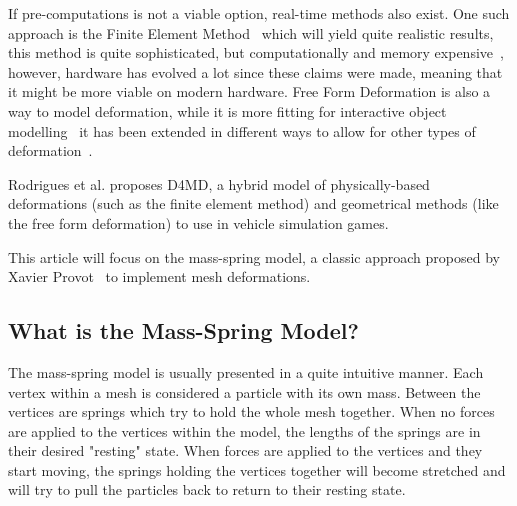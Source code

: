 If pre-computations is not a viable option, real-time methods also exist.
One such approach is the Finite Element Method~\cite{muller_fem} which will yield quite realistic results, this method is quite sophisticated, but computationally and memory expensive~\cite{rodrigues2005d4md}, however, hardware has evolved a lot since these claims were made, meaning that it might be more viable on modern hardware.
Free Form Deformation is also a way to model deformation, while it is more fitting for interactive object modelling~\cite{rodrigues2005d4md} it has been extended in different ways to allow for other types of deformation~\cite{coquillart_eefd}.

Rodrigues et al.\cite{rodrigues2005d4md} proposes D4MD, a hybrid model of physically-based deformations (such as the finite element method) and geometrical methods (like the free form deformation) to use in vehicle simulation games.

This article will focus on the mass-spring model, a classic approach proposed by Xavier Provot~\cite{provot_mass_spring} to implement mesh deformations. 

\subsection{What is the Mass-Spring Model?}
The mass-spring model is usually presented in a quite intuitive manner.
Each vertex within a mesh is considered a particle with its own mass.
Between the vertices are springs which try to hold the whole mesh together.
When no forces are applied to the vertices within the model, the lengths of the springs are in their desired "resting" state.
When forces are applied to the vertices and they start moving, the springs holding the vertices together will become stretched
and will try to pull the particles back to return to their resting state\cite{catlike_mesh_deformation, mosegaards_clothing_simulation, provot_mass_spring}.

